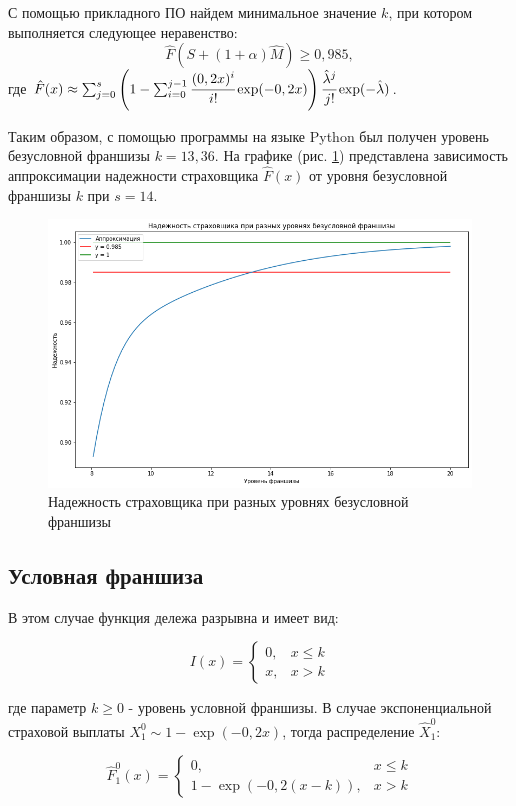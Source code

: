 \documentclass[a4paper,12pt]{article}
\begin{document}
С помощью прикладного ПО найдем минимальное значение $k$, при котором выполняется следующее неравенство:
\[\hat{F}(S + (1 + \alpha)\hat{M}) \ge 0,985,\]
где $\hat{F}(x) \approx \sum_{j = 0}^{s} \left(1 - \sum_{i = 0}^{j - 1} \cfrac{(0,2 x)^i}{i!} \exp(-0,2x)\right) \cfrac{\hat{\lambda}^j}{j!}\exp (-\hat{\lambda})$.

Таким образом, с помощью программы на языке Python был получен уровень безусловной франшизы $k=13,36$. На графике (рис. \ref{fig:graph1}) представлена зависимость аппроксимации надежности страховщика $\hat{F}(x)$ от уровня безусловной франшизы $k$ при $s = 14$.

\begin{figure}[H]
	\centering
	\includegraphics[width=0.9\linewidth]{graph1}
	\caption{Надежность страховщика при разных уровнях безусловной франшизы}
	\label{fig:graph1}
\end{figure}

\subsection{Условная франшиза}

В этом случае функция дележа разрывна и имеет вид: 

$$I(x) = 
	\begin{cases}
		0, &x \le k\\
		x, &x > k
	\end{cases}$$

где параметр $k \ge 0$ - уровень условной франшизы. В случае экспоненциальной страховой выплаты $X_1^0 \sim 1-\exp(-0,2x)$, тогда распределение $\hat{X}_1^0$:

$$\hat{F}_1^0(x) = 
\begin{cases}
	0, &x \le k\\
	1-\exp(-0,2(x-k)), &x > k
\end{cases}$$
\end{document}
